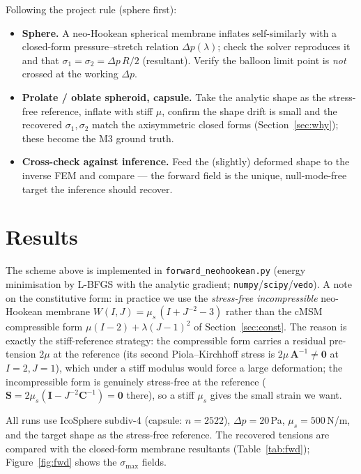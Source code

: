 \documentclass[11pt]{article}
\newcommand{\vv}[1]{\bm{#1}}          %
\newcommand{\CC}{\vv{C}}               %
\newcommand{\Spk}{\vv{S}}               %
\begin{document}
Following the project rule (sphere first):
\begin{itemize}[nosep]
  \item \textbf{Sphere.} A neo-Hookean spherical membrane inflates self-similarly with a
        closed-form pressure--stretch relation $\Delta p(\lambda)$; check the solver
        reproduces it and that $\sigma_1=\sigma_2=\Delta p\,R/2$ (resultant). Verify the
        balloon limit point is \emph{not} crossed at the working $\Delta p$.
  \item \textbf{Prolate / oblate spheroid, capsule.} Take the analytic shape as the
        stress-free reference, inflate with stiff $\mu$, confirm the shape drift is small
        and the recovered $\sigma_1,\sigma_2$ match the axisymmetric closed forms
        (Section~\ref{sec:why}); these become the M3 ground truth.
  \item \textbf{Cross-check against inference.} Feed the (slightly) deformed shape to the
        inverse FEM and compare --- the forward field is the unique, null-mode-free target
        the inference should recover.
\end{itemize}

\section{Results}
\label{sec:results}

The scheme above is implemented in \texttt{forward\_neohookean.py} (energy minimisation by
L-BFGS with the analytic gradient; \texttt{numpy}/\texttt{scipy}/\texttt{vedo}). A note on the
constitutive form: in practice we use the \emph{stress-free incompressible} neo-Hookean membrane
$W(I,J)=\mu_s\,(I+J^{-2}-3)$ rather than the cMSM compressible form $\mu(I-2)+\lambda(J-1)^2$ of
Section~\ref{sec:const}. The reason is exactly the stiff-reference strategy: the compressible form
carries a residual pre-tension $2\mu$ at the reference (its second Piola--Kirchhoff stress is
$2\mu\,\vv A^{-1}\neq\vv0$ at $I=2,J=1$), which under a stiff modulus would force a large
deformation; the incompressible form is genuinely stress-free at the reference
($\Spk=2\mu_s(\vv I-J^{-2}\CC^{-1})=\vv0$ there), so a stiff $\mu_s$ gives the small strain we want.

All runs use IcoSphere subdiv-4 (capsule: $n=2522$), $\Delta p=20$\,Pa, $\mu_s=500$\,N/m, and the
target shape as the stress-free reference. The recovered tensions are compared with the closed-form
membrane resultants (Table~\ref{tab:fwd}); Figure~\ref{fig:fwd} shows the $\sigma_{\max}$ fields.
\end{document}
